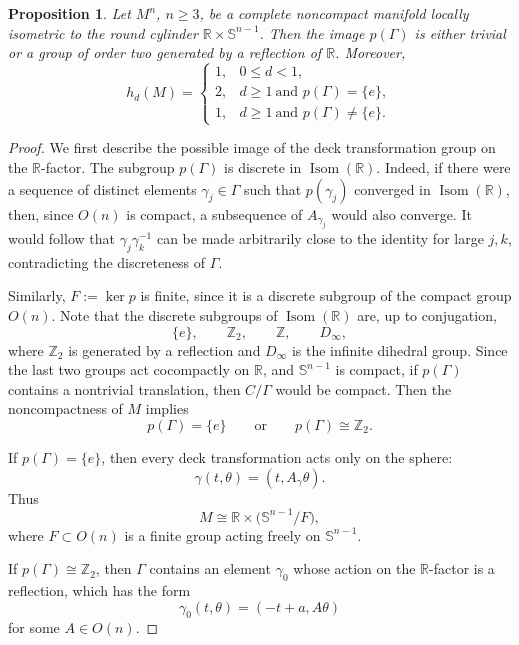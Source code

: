 \documentclass[12pt]{amsart}
\theoremstyle{plain}
\newtheorem{proposition}[theorem]{Proposition}
\theoremstyle{definition}
\theoremstyle{remark}     %
\numberwithin{equation}{section}
\begin{document}
\begin{proposition}\label{prop:cylindrical-case}
Let $M^n$, $n\geq3$, be a complete noncompact manifold locally
isometric to the round cylinder
$\mathbb R\times\mathbb S^{n-1}$.  Then the image
$p(\Gamma)$ is either trivial or a group of order two generated by a
reflection of $\mathbb R$.  Moreover,
\[
h_d(M)
=
\begin{cases}
1, & 0\leq d<1,\\[1mm]
2, & d\geq1 \ \text{and } p(\Gamma)=\{e\},\\[1mm]
1, & d\geq1 \ \text{and } p(\Gamma)\neq\{e\}.
\end{cases}
\]
\end{proposition}

\begin{proof}
We first describe the possible image of the deck transformation group
on the $\mathbb R$-factor.  The subgroup $p(\Gamma)$ is discrete in
$\operatorname{Isom}(\mathbb R)$.  Indeed, if there were a sequence of
distinct elements $\gamma_j\in\Gamma$ such that $p(\gamma_j)$ converged
in $\operatorname{Isom}(\mathbb R)$, then, since $O(n)$ is compact, a
subsequence of $A_{\gamma_j}$ would also converge.  It would follow
that $\gamma_j\gamma_k^{-1}$ can be made arbitrarily close to the
identity for large $j,k$, contradicting the discreteness of $\Gamma$.

Similarly, $F:=\ker p$
is finite, since it is a discrete subgroup of the compact group $O(n)$.
Note that the discrete subgroups of $\operatorname{Isom}(\mathbb R)$ are, up to
conjugation,
\[
\{e\},\qquad
\mathbb Z_2,\qquad
\mathbb Z,\qquad
D_\infty,
\]
where $\mathbb Z_2$ is generated by a reflection and $D_\infty$ is the
infinite dihedral group. Since  the last two groups act cocompactly on
$\mathbb R$, and $\mathbb S^{n-1}$ is compact, if $p(\Gamma)$
contains a nontrivial translation, then
$ C/\Gamma$ would be compact.  Then the noncompactness of $M$ implies
\[
p(\Gamma)=\{e\}
\qquad\text{or}\qquad
p(\Gamma)\cong\mathbb Z_2.
\]

If $p(\Gamma)=\{e\}$, then every deck transformation acts only on the
sphere:
\[
\gamma(t,\theta)=(t,A_\gamma\theta).
\]
Thus
\[
M\cong
\mathbb R\times\bigl(\mathbb S^{n-1}/F\bigr),
\]
where $F\subset O(n)$ is a finite group acting freely on
$\mathbb S^{n-1}$.

If $p(\Gamma)\cong\mathbb Z_2$, then $\Gamma$ contains an element
$\gamma_0$ whose action on the $\mathbb R$-factor is a reflection, 
  which has the form
\[
\gamma_0(t,\theta)=(-t+a,A\theta)
\]
for some $A\in O(n)$.


\end{proof}
\end{document}
